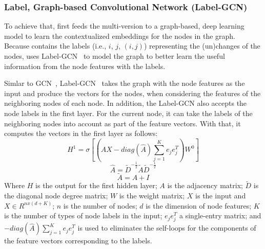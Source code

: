 \subsubsection{{\bf Label, Graph-based Convolutional Network (Label-GCN)}}

To achieve that, {\tool} first feeds the multi-version {\mvpdg} to a
graph-based, deep learning model to learn the contextualized
embeddings for the nodes in the graph. Because {\mvpdg} contains the
labels (i.e., $i$, $j$, $(i,j)$) representing the (un)changes of the
nodes, {\tool} uses Label-GCN~\cite{yi} to model the graph to better
learn the useful information from the node features with the labels.




Simlar to GCN~\cite{yi}, Label-GCN~\cite{yi} takes the graph with the
node features as the input and produce the vectors for the nodes, when
considering the features of the neighboring nodes of each node.  In
addition, the Label-GCN also accepts the node labels in the first
layer. For the current node, it can take the labels of the
neighboring nodes into account as part of the feature vectors. With
that, it computes the vectors in the first layer as follows:
\begin{equation}\label{eq1}
	H^1 = \sigma [(\hat{A}X-diag(\hat{A})\sum_{j=1}^{K}e_je^T_j)W^0]
\end{equation}
\begin{equation}\label{eq2}
	\hat{A} = \tilde{D}^{-\frac{1}{2}}\tilde{A}\tilde{D}^{-\frac{1}{2}}
\end{equation}
\begin{equation}\label{eq3}
	\tilde{A} = A + I
\end{equation}
Where $H$ is the output for the first hidden layer; $A$ is the
adjacency matrix; $\tilde{D}$ is the diagonal node degree matrix; $W$
is the weight matrix; $X$ is the input and $X \in R^{nx(d+K)}$; $n$ is
the number of nodes; $d$ is the dimension of node features; $K$ is the
number of types of node labels in the input; $e_je^T_j$ a single-entry
matrix; and $-diag(\hat{A})\sum_{j=1}^{K}e_je^T_j$ is used to
eliminates the self-loops for the components of the feature vectors
corresponding to the labels.

